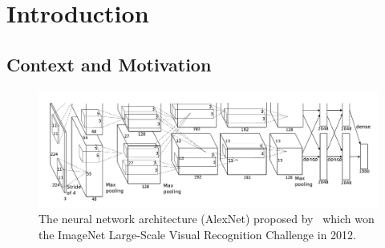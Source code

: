 \chapter{Introduction}
\label{chapter:ch1-introduction}
\localtoc

\section{Context and Motivation}
\label{section:ch1-context_and_motivation}



\begin{figure}[t]
  \centering
  \includegraphics[scale=0.24]{figures/main/ch1-introduction/alexnet.png}
  \caption{The neural network architecture (AlexNet) proposed by~\citet{krizhevsky2012imagenet} which won the ImageNet Large-Scale Visual Recognition Challenge in 2012.}
  \label{figure:ch1-alexnet_network}
\end{figure}

